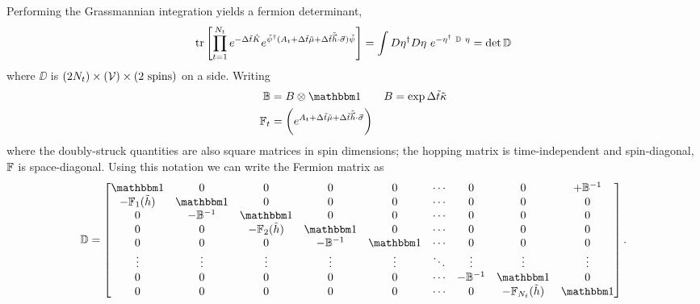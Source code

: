 Performing the Grassmannian integration yields a fermion determinant,
\begin{align}
	\text{tr}\left[\prod_{t=1}^{N_t} e^{-\Delta \tilde{t}\tilde{K}} e^{ \tilde{\psi}{}^{\dagger} (A_t + \Delta\tilde{t}\tilde{\mu} + \Delta\tilde{t}\tilde{\vec{h}}\cdot\vec{\sigma}) \tilde{\psi}} \right]
	=
	\int D\eta{}^{\dagger} D\eta ~ e^{- \eta^{\dagger} ~ \mathbb{D} ~ \eta} = \det \mathbb{D}
	\label{eq:fermion determinant with 2nt timeslices}
\end{align}
where $\DD$ is $(2N_t)\times(\mathcal{V})\times(2\text{ spins})$ on a side.
Writing
\begin{align}
	\BB &= B \otimes \one
	&
	B &= \exp \Delta\tilde{t} \tilde{\kappa}
	\label{eq:BB}\\
	\FF_t &= \left(e^{A_{t}+\Delta\tilde{t}\tilde{\mu} + \Delta\tilde{t}\tilde{\vec{h}}\cdot\vec{\sigma}}\right)
	\label{eq:FF}
\end{align}
where the doubly-struck quantities are also square matrices in spin dimensions; the hopping matrix is time-independent and spin-diagonal, $\mathbb{F}$ is space-diagonal.
Using this notation we can write the Fermion matrix as
\begin{align}
	\DD = \begin{bmatrix} 
			\one            & 0         & 0                 & 0         & 0      & \cdots & 0       & 0                     & +\BB^{-1}
		\\	-\FF_1(\tilde{h}) & \one      & 0                 & 0         & 0      & \cdots & 0       & 0                     & 0
		\\	0               & -\BB^{-1}   & \one              & 0         & 0      & \cdots & 0       & 0                     & 0
		\\	0               & 0         & -\FF_2(\tilde{h})   & \one      & 0      & \cdots & 0       & 0                     & 0
		\\	0               & 0         & 0                 & -\BB^{-1}   & \one   & \cdots & 0       & 0                     & 0
		\\	\vdots          & \vdots    & \vdots            & \vdots    & \vdots & \ddots & \vdots  & \vdots                & \vdots
		\\	0               & 0         & 0                 & 0         & 0      & \cdots & -\BB^{-1} & \one                  & 0
		\\	0               & 0         & 0                 & 0         & 0      & \cdots & 0       & -\FF_{N_t}(\tilde{h})   & \one
	\end{bmatrix}.
\end{align}
